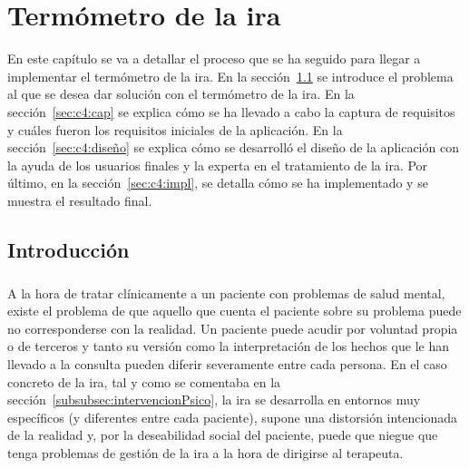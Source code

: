 %
%

\chapter{Termómetro de la ira}

En este capítulo se va a detallar el proceso que se ha seguido para llegar a implementar el termómetro de la ira. En la sección~\ref{sec:c4:intro} se introduce el problema al que se desea dar solución con el termómetro de la ira. En la sección~\ref{sec:c4:cap} se explica cómo se ha llevado a cabo la captura de requisitos y cuáles fueron los requisitos iniciales de la aplicación. En la sección~\ref{sec:c4:diseño} se explica cómo se desarrolló el diseño de la aplicación con la ayuda de los usuarios finales y la experta en el tratamiento de la ira. Por último, en la sección~\ref{sec:c4:impl}, se detalla cómo se ha implementado y se muestra el resultado final.

\section{Introducción}
\label{sec:c4:intro}
\paragraph{}
A la hora de tratar clínicamente a un paciente con problemas de salud mental, existe el problema de que aquello que cuenta el paciente sobre su problema puede no corresponderse con la realidad. Un paciente puede acudir por voluntad propia o de terceros y tanto su versión como la interpretación de los hechos que le han llevado a la consulta pueden diferir severamente entre cada persona. En el caso concreto de la ira, tal y como se comentaba en la sección~\ref{subsubsec:intervencionPsico}, la ira se desarrolla en entornos muy específicos (y diferentes entre cada paciente), supone una distorsión intencionada de la realidad y, por la deseabilidad social del paciente, puede que niegue que tenga problemas de gestión de la ira a la hora de dirigirse al terapeuta.

